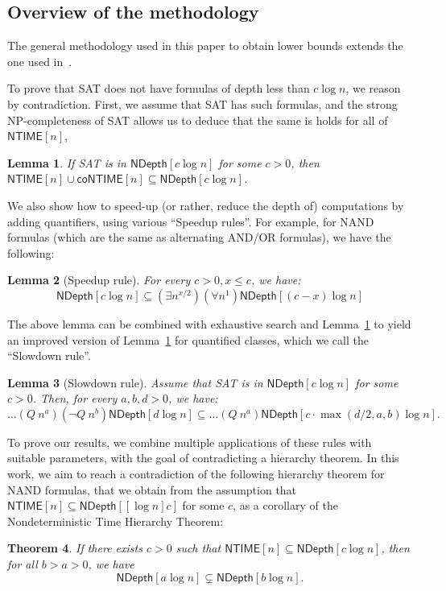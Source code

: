 \documentclass[a4paper, 11pt]{article}
\theoremstyle{plain}
\newtheorem{theorem}{Theorem}[section] %
\newtheorem{lemma}[theorem]{Lemma}
\theoremstyle{definition}
\theoremstyle{remark}
\newcommand{\NP}{\textsf{NP}}%
\newcommand{\NTIME}{\textsf{NTIME}}%
\newcommand{\coNTIME}{\textsf{coNTIME}}%
\newcommand{\SAT}{\textsf{SAT}}%
\newcommand{\ND}{\textsf{NDepth}}%
\newcommand{\NDL}[1]{\ND[ #1 \log n]}%
\begin{document}
\subsection{Overview of the methodology}

The general methodology used in this paper to obtain lower bounds
extends the one used in~\cite{mudigonda2020time}.

To prove that \SAT{} does not have formulas of depth less than $c\log n$, 
we reason by contradiction.
First, we assume that \SAT{} has such formulas, and the strong \NP-completeness of \SAT{}
allows us to deduce that the same is holds for all of $\NTIME[n]$, 
\begin{lemma}\label{lemma:usual_sd}
	If \SAT{} is in $\NDL{c}$ for some $c>0$,
	then $\NTIME[n] \cup \coNTIME[n] \subseteq \NDL{c}$.
\end{lemma}

We also show how to speed-up (or rather, reduce the depth of) computations by adding quantifiers, 
using various ``Speedup rules''. 
For example, for NAND formulas (which are the same as alternating AND/OR formulas), we have the following:
\begin{lemma}[Speedup rule]
	For every $c > 0, x \leq c$, we have:
	\[\NDL{c} \subseteq (\exists n^{x/2}) (\forall n^1) \NDL{(c-x)}\]
\end{lemma}


The above lemma can be combined with exhaustive search and Lemma~\ref{lemma:usual_sd} 
to yield an improved version of Lemma~\ref{lemma:usual_sd} for quantified classes, 
which we call the ``Slowdown rule''.
\begin{lemma}[Slowdown rule]
	Assume that \SAT{} is in $\NDL{c}$ for some $c>0$.
	Then, for every $a,b,d > 0$, we have:
	\[\ldots (Q~n^{a}) (\neg Q~n^b) \NDL{d}
	\subseteq \ldots (Q~n^{a}) \NDL{c\cdot\max(d/2, a, b)}.\]
\end{lemma}


To prove our results, 
we combine multiple applications of these rules with suitable parameters,
with the goal of contradicting a hierarchy theorem.
In this work, we aim to reach a contradiction of the following hierarchy
theorem for NAND formulas, that we obtain from the assumption that
$\NTIME[n] \subseteq \NDL[c]$ for some $c$, 
as a corollary of the Nondeterministic Time Hierarchy Theorem:
\begin{theorem}\label{thm:nandh}
	If there exists $c > 0$ such that $\NTIME[n] \subseteq \NDL{c}$, 
	then for all $b > a > 0$, we have
	\[\NDL{a} \subsetneq \NDL{b}.\] 
\end{theorem}
\end{document}
